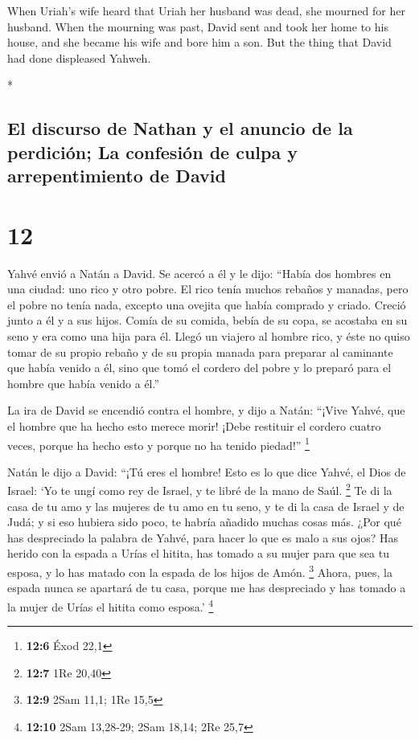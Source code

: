 \begin{paracol}{2}
\begin{otherlanguage}{english}
 When Uriah's wife heard that Uriah her husband was dead,
she mourned for her husband.  When the mourning was past,
David sent and took her home to his house, and she became his wife and
bore him a son. But the thing that David had done displeased Yahweh.

\end{otherlanguage}

\switchcolumn[0]*

\hypertarget{el-discurso-de-nathan-y-el-anuncio-de-la-perdiciuxf3n-la-confesiuxf3n-de-culpa-y-arrepentimiento-de-david}{%
\subsection{El discurso de Nathan y el anuncio de la perdición; La
confesión de culpa y arrepentimiento de
David}\label{el-discurso-de-nathan-y-el-anuncio-de-la-perdiciuxf3n-la-confesiuxf3n-de-culpa-y-arrepentimiento-de-david}}

\hypertarget{section-22}{%
\section{12}\label{section-22}}

 Yahvé envió a Natán a David. Se acercó a él y le dijo:
``Había dos hombres en una ciudad: uno rico y otro pobre. 
El rico tenía muchos rebaños y manadas,  pero el pobre no
tenía nada, excepto una ovejita que había comprado y criado. Creció
junto a él y a sus hijos. Comía de su comida, bebía de su copa, se
acostaba en su seno y era como una hija para él.  Llegó un
viajero al hombre rico, y éste no quiso tomar de su propio rebaño y de
su propia manada para preparar al caminante que había venido a él, sino
que tomó el cordero del pobre y lo preparó para el hombre que había
venido a él.''

 La ira de David se encendió contra el hombre, y dijo a
Natán: ``¡Vive Yahvé, que el hombre que ha hecho esto merece morir!
 ¡Debe restituir el cordero cuatro veces, porque ha hecho
esto y porque no ha tenido piedad!'' \footnote{\textbf{12:6} Éxod 22,1}

 Natán le dijo a David: ``¡Tú eres el hombre! Esto es lo
que dice Yahvé, el Dios de Israel: `Yo te ungí como rey de Israel, y te
libré de la mano de Saúl. \footnote{\textbf{12:7} 1Re 20,40}
 Te di la casa de tu amo y las mujeres de tu amo en tu
seno, y te di la casa de Israel y de Judá; y si eso hubiera sido poco,
te habría añadido muchas cosas más.  ¿Por qué has
despreciado la palabra de Yahvé, para hacer lo que es malo a sus ojos?
Has herido con la espada a Urías el hitita, has tomado a su mujer para
que sea tu esposa, y lo has matado con la espada de los hijos de Amón.
\footnote{\textbf{12:9} 2Sam 11,1; 1Re 15,5}  Ahora,
pues, la espada nunca se apartará de tu casa, porque me has despreciado
y has tomado a la mujer de Urías el hitita como esposa.' \footnote{\textbf{12:10}
  2Sam 13,28-29; 2Sam 18,14; 2Re 25,7}


\end{paracol}
